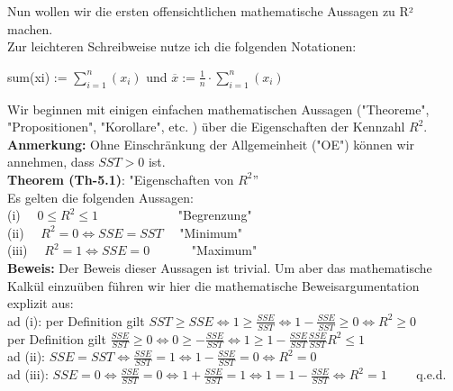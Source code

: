 \documentclass[12pt]{article}
\begin{document}
Nun wollen wir die ersten offensichtlichen mathematische Aussagen zu R² machen. \\
Zur leichteren Schreibweise nutze ich die folgenden Notationen:\\
\begin{center}
sum(xi) := $ \sum\limits_{i=1}^n(x_i) $  und  $ \overline{x} := \frac{1}{n} \cdot \sum\limits_{i=1}^n(x_i) $\\[0.2cm]
\end{center}
Wir beginnen mit einigen einfachen mathematischen Aussagen ("Theoreme", "Propositionen", "Korollare", etc. ) über die Eigenschaften der Kennzahl $R^2$.\\[0.2cm]
\textbf{Anmerkung:} Ohne Einschränkung der Allgemeinheit ("OE") können wir annehmen, dass $SST > 0$ ist.\\[0.2cm] 
%
\textbf{Theorem (Th-5.1)}: "Eigenschaften von $R^2$”\\[0.2cm]
Es gelten die folgenden Aussagen:\\[0.3cm]
(i)  $ \quad 0 \leqslant R^2 \leqslant 1 \quad\quad\quad\quad\quad\quad $   "Begrenzung"\\[0.2cm]                                       
(ii) $ \quad R^2 = 0 \Leftrightarrow SSE = SST \quad $                      "Minimum"\\[0.2cm]                                       
(iii) $ \quad R^2 = 1 \Leftrightarrow SSE = 0 \quad\quad\quad $                 "Maximum"\\[0.4cm]                                       
\textbf{Beweis:}
Der Beweis dieser Aussagen ist trivial. Um aber das mathematische Kalkül einzuüben führen wir hier die mathematische Beweisargumentation explizit aus:\\[0.2cm]
ad (i): per Definition gilt $ SST \geqslant SSE \Leftrightarrow 1 \geqslant \frac{SSE}{SST} \Leftrightarrow 1- \frac{SSE}{SST} \geqslant 0 \Leftrightarrow R^2\geqslant 0 $\\[0.2cm]                                       
per Definition gilt $ \frac{SSE}{SST} \geqslant 0 \Leftrightarrow 0 \geqslant -\frac{SSE}{SST} \Leftrightarrow 1 \geqslant 1- \frac{SSE}{SST} \frac{SSE}{SST} R^2 \leqslant 1 $ \\[0.3cm]                                       
ad (ii): $ SSE = SST \Leftrightarrow \frac{SSE}{SST} = 1 \Leftrightarrow 1 - \frac{SSE}{SST} = 0 \Leftrightarrow R^2 = 0 $ \\[0.2cm]                                                                           
ad (iii): $SSE = 0 \Leftrightarrow \frac{SSE}{SST} = 0 \Leftrightarrow  1 + \frac{SSE}{SST} = 1 \Leftrightarrow  1 = 1 -  \frac{SSE}{SST} \Leftrightarrow  R^2 = 1 \qquad $ q.e.d. \\[0.3cm] 
\end{document}
